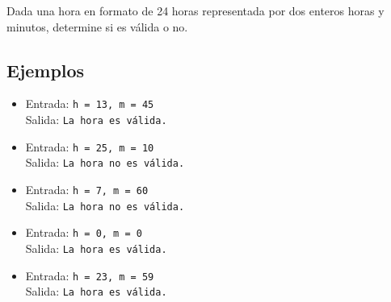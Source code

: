 Dada una hora en formato de 24 horas representada por dos enteros horas y minutos, determine si es válida o no.
\subsection*{Ejemplos}
\begin{itemize}
   \item Entrada: \texttt{h = 13, m = 45}\\
         Salida: \texttt{La hora es válida.}
   \item Entrada: \texttt{h = 25, m = 10}\\
         Salida: \texttt{La hora no es válida.}
   \item Entrada: \texttt{h = 7, m = 60}\\
         Salida: \texttt{La hora no es válida.}
   \item Entrada: \texttt{h = 0, m = 0}\\
         Salida: \texttt{La hora es válida.}
   \item Entrada: \texttt{h = 23, m = 59}\\
         Salida: \texttt{La hora es válida.}
\end{itemize}